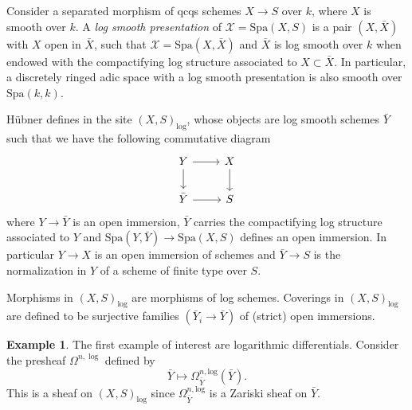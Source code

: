 \documentclass{amsart}
\def\Spa{\textrm{Spa}}
\theoremstyle{definition}
\newtheorem{example}[theorem]{Example}
\newcommand\llog{\mathrm{log}}
\numberwithin{equation}{section}
\begin{document}
Consider a separated morphism of qcqs schemes $X\to S$ over $k$, where $X$ is smooth over $k$. A \textit{log smooth presentation} of $\mathcal{X}=\Spa(X,S)$ is a pair $(X,\bar{X})$ with $X$ open in $\bar{X}$, such that $\mathcal{X}=\Spa(X,\bar{X})$ and $\bar{X}$ is log smooth over $k$ when endowed with the compactifying log structure associated to $X\subset \bar{X}$. In particular, a discretely ringed adic space with a log smooth presentation is also smooth over $\Spa(k,k)$.

Hübner defines in \cite{LogDiff} the site $(X,S)_\llog$, whose objects are log smooth schemes $\bar{Y}$ such that we have the following commutative diagram
\[
\begin{tikzcd}
	Y\ar[r]\ar[d]&X\ar[d]\\
	\bar{Y}\ar[r]&S
\end{tikzcd}
\]
where $Y\to \bar{Y}$ is an open immersion, $\bar{Y}$ carries the compactifying log structure associated to $Y$ and $\Spa(Y,\bar{Y})\to \Spa(X,S)$ defines an open immersion. In particular $Y\to X$ is an open immersion of schemes and $\bar{Y}\to S$ is the normalization in $Y$ of a scheme of finite type over $S$.

Morphisms in $(X,S)_\llog$ are morphisms of log schemes. Coverings in $(X,S)_\llog$ are defined to be surjective families $(\bar{Y}_i\to \bar{Y})$ of (strict) open immersions.

\begin{example}
	The first example of interest are logarithmic differentials. Consider the presheaf $\Omega^{n,\log}$ defined by
	\[
	\bar{Y}\mapsto \Omega^{n,\llog}_{\bar{Y}}(\bar{Y}).
	\]
	This is a sheaf on $(X,S)_\llog$ since $\Omega^{n,\llog}_{\bar{Y}}$ is a Zariski sheaf on $\bar{Y}$.
\end{example}
\end{document}
